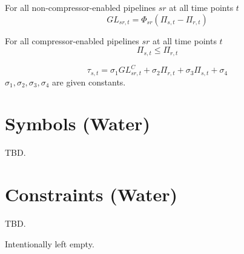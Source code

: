 \documentclass{article}
\begin{document}
For all non-compressor-enabled pipelines $sr$ at all time points $t$
\begin{equation}
  GL_{sr,t} = \Phi_{sr}(\Pi_{s,t} - \Pi_{r,t})
\end{equation}

For all compressor-enabled pipelines $sr$ at all time points $t$
\begin{equation}
  \Pi_{s,t} \leq \Pi_{r,t}
\end{equation}

\begin{equation}
  \tau_{s,t} =
  \sigma_1 GL^C_{sr,t} + \sigma_2 \Pi_{r,t} + \sigma_3 \Pi_{s,t} + \sigma_4
\end{equation}
$\sigma_1, \sigma_2, \sigma_3, \sigma_4$ are given constants.


\section{Symbols (Water)}
TBD.

\section{Constraints (Water)}
TBD.

\newpage
Intentionally left empty.
\end{document}
